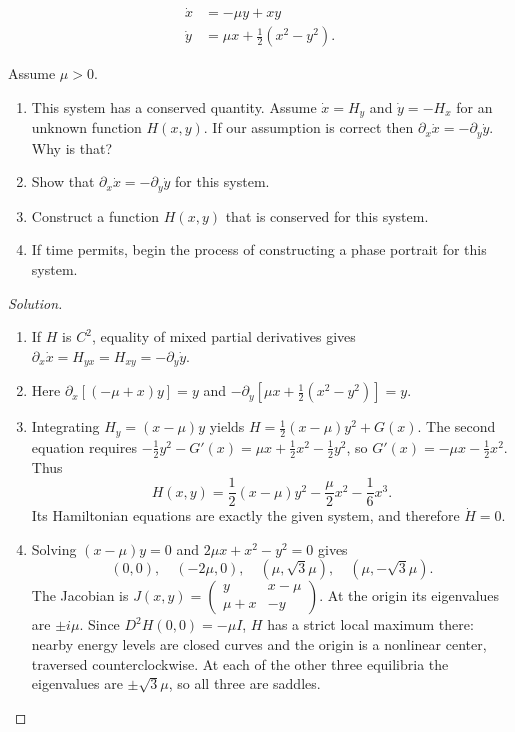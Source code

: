 \documentclass[12pt]{amsart}
\theoremstyle{plain}
\theoremstyle{definition}
\theoremstyle{definition}
\theoremstyle{plain}
\newenvironment{solution}
{\begin{proof}[Solution]}
{\end{proof}}
\begin{document}
    \[
        \begin{aligned}
            \dot{x}&=-\mu y+xy\\
            \dot{y}&=\mu x+\frac12(x^2-y^2).
        \end{aligned}
    \]

    Assume $\mu>0$.

    \begin{enumerate}[label=(\alph*)]

\item This system has a conserved quantity. Assume $\dot{x}=H_y$ and $\dot{y}=-H_x$ for an
unknown function $H(x,y)$. If our assumption is correct then
$\partial_x\dot{x}=-\partial_y\dot{y}$. Why is that?

\item Show that $\partial_x\dot{x}=-\partial_y\dot{y}$ for this system.

\item Construct a function $H(x,y)$ that is conserved for this system.

\item If time permits, begin the process of constructing a phase portrait for this system.

    \end{enumerate}



    \begin{solution}
    \begin{enumerate}[label=(\alph*)]
    \item If $H$ is $C^2$, equality of mixed partial derivatives gives
    $\partial_x\dot x=H_{yx}=H_{xy}=-\partial_y\dot y$.
    \item Here $\partial_x[(-\mu+x)y]=y$ and
    $-\partial_y[\mu x+\tfrac12(x^2-y^2)]=y$.
    \item Integrating $H_y=(x-\mu)y$ yields
    $H=\tfrac12(x-\mu)y^2+G(x)$. The second equation requires
    $-\tfrac12y^2-G'(x)=\mu x+\tfrac12x^2-\tfrac12y^2$,
    so $G'(x)=-\mu x-\tfrac12x^2$. Thus
    \[
      \boxed{H(x,y)=\frac12(x-\mu)y^2-\frac\mu2x^2-\frac16x^3.}
    \]
    Its Hamiltonian equations are exactly the given system, and therefore
    $\dot H=0$.
    \item Solving $(x-\mu)y=0$ and $2\mu x+x^2-y^2=0$ gives
    \[
      (0,0),\quad(-2\mu,0),\quad(\mu,\sqrt3\mu),\quad(\mu,-\sqrt3\mu).
    \]
    The Jacobian is
    $J(x,y)=\left(\begin{smallmatrix}y&x-\mu\\\mu+x&-y\end{smallmatrix}\right)$.
    At the origin its eigenvalues are $\pm i\mu$. Since
    $D^2H(0,0)=-\mu I$, $H$ has a strict local maximum there:
    nearby energy levels are closed curves and the origin is a nonlinear
    center, traversed counterclockwise. At each of the other three
    equilibria the eigenvalues are $\pm\sqrt3\mu$, so all three are saddles.
    \end{enumerate}
    \end{solution}
\end{document}
